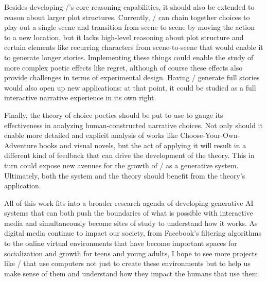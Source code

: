 Besides developing \dunyazad/'s core reasoning capabilities, it should also be extended to reason about larger plot structures.
%
Currently, \dunyazad/ can chain together choices to play out a single scene and transition from scene to scene by moving the action to a new location, but it lacks high-level reasoning about plot structure and certain elements like recurring characters from scene-to-scene that would enable it to generate longer stories.
%
Implementing these things could enable the study of more complex poetic effects like regret, although of course these effects also provide challenges in terms of experimental design.
%
Having \dunyazad/ generate full stories would also open up new applications: at that point, it could be studied as a full interactive narrative experience in its own right.


Finally, the theory of choice poetics should be put to use to gauge its effectiveness in analyzing human-constructed narrative choices.
%
Not only should it enable more detailed and explicit analysis of works like Choose-Your-Own-Adventure books and visual novels, but the act of applying it will result in a different kind of feedback that can drive the development of the theory.
%
This in turn could expose new avenues for the growth of \dunyazad/ as a generative system.
%
Ultimately, both the system and the theory should benefit from the theory's application.


All of this work fits into a broader research agenda of developing generative AI systems that can both push the boundaries of what is possible with interactive media and simultaneously become sites of study to understand how it works.
%
As digital media continue to impact our society, from Facebook's filtering algorithms to the online virtual environments that have become important spaces for socialization and growth for teens and young adults, I hope to see more projects like \dunyazad/ that use computers not just to create these environments but to help us make sense of them and understand how they impact the humans that use them.
